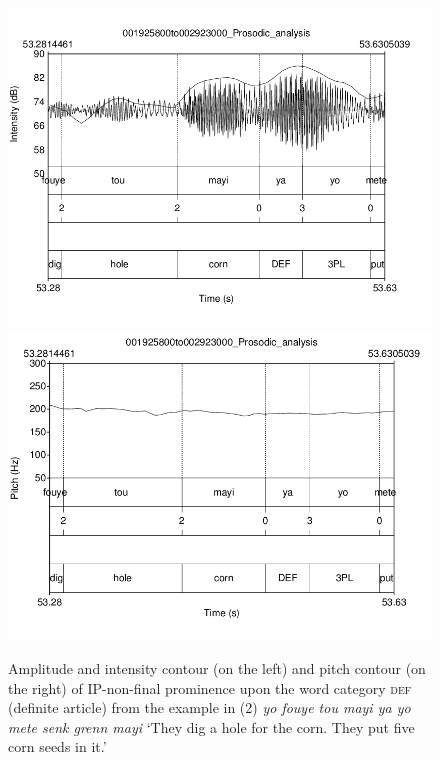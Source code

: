 \documentclass[output=paper]{langsci/langscibook}
\begin{document}
  
\begin{figure}
 \includegraphics[width=\textwidth]{figures/KALPeerreviewedkorr-img10.png}   
   \includegraphics[width=\textwidth]{figures/KALPeerreviewedkorr-img11.png}
   
\caption{\label{fig:kal:7} Amplitude and intensity contour (on the left) and pitch contour (on the right) of IP-non-final prominence upon the word category \textsc{def} (definite article) from the example in (2) \textit{yo fouye tou mayi ya yo mete senk grenn mayi} ‘They dig a hole for the corn. They put five corn seeds in it.’}
\end{figure}
\end{document}
